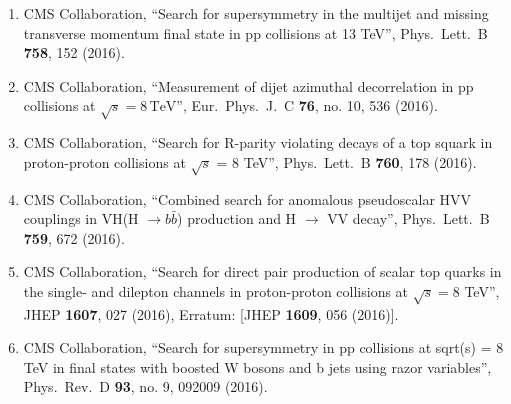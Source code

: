 \begin{itemize}
\begin{enumerate}
\item CMS Collaboration, ``Search for supersymmetry in the multijet and missing transverse momentum final state in pp collisions at 13 TeV'', Phys.\ Lett.\ B {\bf 758}, 152 (2016).

\item CMS Collaboration, ``Measurement of dijet azimuthal decorrelation in pp collisions at $\sqrt{s}=8\,\mathrm{TeV} $'', Eur.\ Phys.\ J.\ C {\bf 76}, no. 10, 536 (2016).

\item CMS Collaboration, ``Search for R-parity violating decays of a top squark in proton-proton collisions at $\sqrt{s}$ = 8 TeV'', Phys.\ Lett.\ B {\bf 760}, 178 (2016).

\item CMS Collaboration, ``Combined search for anomalous pseudoscalar HVV couplings in VH(H $\to b \bar b$) production and H $\to$ VV decay'', Phys.\ Lett.\ B {\bf 759}, 672 (2016).

\item CMS Collaboration, ``Search for direct pair production of scalar top quarks in the single- and dilepton channels in proton-proton collisions at $ \sqrt{s}=8 $ TeV'', JHEP {\bf 1607}, 027 (2016), Erratum: [JHEP {\bf 1609}, 056 (2016)].

\item CMS Collaboration, ``Search for supersymmetry in pp collisions at sqrt(s) = 8 TeV in final states with boosted W bosons and b jets using razor variables'', Phys.\ Rev.\ D {\bf 93}, no. 9, 092009 (2016).


\end{enumerate}
\end{itemize}

